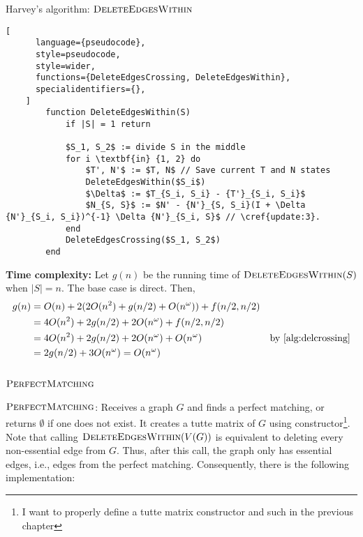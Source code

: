 \begin{programruledcaption}{Harvey's algorithm: \(\textsc{DeleteEdgesWithin}\)}
    \begin{lstlisting}[
      language={pseudocode},
      style=pseudocode,
      style=wider,
      functions={DeleteEdgesCrossing, DeleteEdgesWithin},
      specialidentifiers={},
    ]
        function DeleteEdgesWithin(S)
            if |S| = 1 return

            $S_1, S_2$ := divide S in the middle
            for i \textbf{in} {1, 2} do
                $T', N'$ := $T, N$ // Save current T and N states
                DeleteEdgesWithin($S_i$)
                $\Delta$ := $T_{S_i, S_i} - {T'}_{S_i, S_i}$
                $N_{S, S}$ := $N' - {N'}_{S, S_i}(I + \Delta {N'}_{S_i, S_i})^{-1} \Delta {N'}_{S_i, S}$ // \cref{update:3}. 
            end
            DeleteEdgesCrossing($S_1, S_2$)
        end
    \end{lstlisting}
\end{programruledcaption}

\textbf{Time complexity:} Let \(g(n)\) be the running time of \(\textsc{DeleteEdgesWithin}(S)\) when \(|S| = n\).
The base case is direct.
Then, 
\begin{align}
    g(n) &= O(n) + 2 (2O(n^2) + g(n / 2) + O(n^\omega)) + f(n / 2, n / 2) &  \\
    &= 4O(n^2) + 2g(n / 2) + 2O(n^\omega) + f(n / 2, n / 2) & \\ 
    &= 4O(n^2) + 2g(n / 2) + 2O(n^\omega) + O(n^\omega) & \text{by \ref{alg:delcrossing}} \\ 
    &= 2g(n / 2) + 3O(n^\omega) = O(n^\omega) & \label{alg:delwithin}
\end{align}

\subsection{\(\textsc{PerfectMatching}\)}

\(\textsc{PerfectMatching}\): Receives a graph \(G\) and finds a perfect matching, or returns \(\emptyset\) if one does not exist.
It creates a tutte matrix of \(G\) using constructor\footnote{I want to properly define a tutte matrix constructor and such in the previous chapter}.
Note that calling \(\textsc{DeleteEdgesWithin}(V(G))\) is equivalent to deleting every non-essential edge from \(G\).
Thus, after this call, the graph only has essential edges, i.e., edges from the perfect matching. 
Consequently, there is the following implementation:


